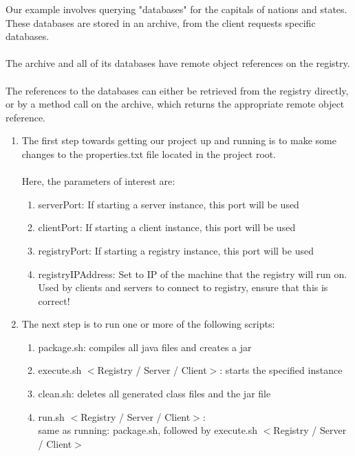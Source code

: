 \documentclass[11pt,letterpaper]{article}
\begin{document}
Our example involves querying "databases" for the capitals of nations and states.\\
These databases are stored in an archive, from the client requests specific databases.\\
\\
The archive and all of its databases have remote object references on the registry.\\
\\
The references to the databases can either be retrieved from the registry directly, or by a method call on the archive, which returns the appropriate remote object reference.\\
\begin{enumerate}[1)]
\item The first step towards getting our project up and running is to make some changes to the properties.txt file located in the project root.\\
\\
Here, the parameters of interest are:
\begin{enumerate}[i]
\item serverPort: If starting a server instance, this port will be used
\item clientPort: If starting a client instance, this port will be used
\item registryPort: If starting a registry instance, this port will be used
\item registryIPAddress: Set to IP of the machine that the registry will run on.\\
\hspace*{93pt}Used by clients and servers to connect to registry, ensure that this is correct!
\end{enumerate}

\newpage

\item The next step is to run one or more of the following scripts:
\begin{enumerate}[i]
\item package.sh: compiles all java files and creates a jar
\item execute.sh $<$Registry / Server / Client$>$: starts the specified instance
\item clean.sh: deletes all generated class files and the jar file
\item run.sh $<$Registry / Server / Client$>$:	\\
same as running: package.sh,  
		followed by execute.sh $<$Registry / Server / Client$>$
\end{enumerate}


\end{enumerate}
\end{document}
